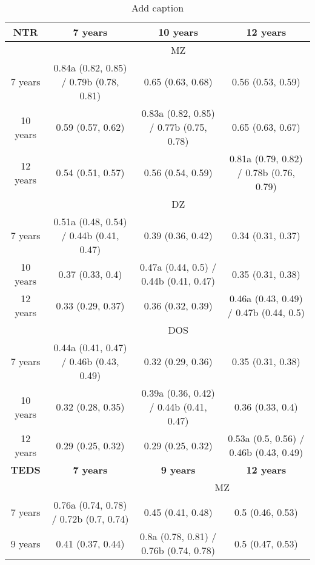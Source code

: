 \begin{table}[htbp]
  \centering
  \caption{Add caption}
    \begin{tabular}{ccccc}
    \toprule
    \textbf{NTR} & \multicolumn{2}{c}{\textbf{7 years}} & \textbf{10 years} & \textbf{12 years} \\
    \midrule
          & \multicolumn{4}{c}{MZ} \\
    7 years & \multicolumn{2}{c}{0.84a (0.82, 0.85) / 0.79b (0.78, 0.81)} & 0.65 (0.63, 0.68) & 0.56 (0.53, 0.59) \\
    10 years & \multicolumn{2}{c}{0.59 (0.57, 0.62)} & 0.83a (0.82, 0.85) / 0.77b (0.75, 0.78) & 0.65 (0.63, 0.67) \\
    12 years & \multicolumn{2}{c}{0.54 (0.51, 0.57)} & 0.56 (0.54, 0.59) & 0.81a (0.79, 0.82) / 0.78b (0.76, 0.79) \\
\cmidrule{1-4}          & \multicolumn{4}{c}{DZ} \\
    7 years & \multicolumn{2}{c}{0.51a (0.48, 0.54) / 0.44b (0.41, 0.47)} & 0.39 (0.36, 0.42) & 0.34 (0.31, 0.37) \\
    10 years & \multicolumn{2}{c}{0.37 (0.33, 0.4)} & 0.47a (0.44, 0.5) / 0.44b (0.41, 0.47) & 0.35 (0.31, 0.38) \\
    12 years & \multicolumn{2}{c}{0.33 (0.29, 0.37)} & 0.36 (0.32, 0.39) & 0.46a (0.43, 0.49) / 0.47b (0.44, 0.5) \\
\cmidrule{1-4}          & \multicolumn{4}{c}{DOS} \\
    7 years & \multicolumn{2}{c}{0.44a (0.41, 0.47) / 0.46b (0.43, 0.49)} & 0.32 (0.29, 0.36) & 0.35 (0.31, 0.38) \\
    10 years & \multicolumn{2}{c}{0.32 (0.28, 0.35)} & 0.39a (0.36, 0.42) / 0.44b (0.41, 0.47) & 0.36 (0.33, 0.4) \\
    12 years & \multicolumn{2}{c}{0.29 (0.25, 0.32)} & 0.29 (0.25, 0.32) & 0.53a (0.5, 0.56) / 0.46b (0.43, 0.49) \\
    \midrule
    \textbf{TEDS} & \multicolumn{2}{c}{\textbf{7 years}} & \textbf{9 years} & \textbf{12 years} \\
    \midrule
          &       & \multicolumn{3}{c}{MZ} \\
    7 years & \multicolumn{2}{c}{0.76a (0.74, 0.78) / 0.72b (0.7, 0.74)} & 0.45 (0.41, 0.48) & 0.5 (0.46, 0.53) \\
    9 years & \multicolumn{2}{c}{0.41 (0.37, 0.44)} & 0.8a (0.78, 0.81) / 0.76b (0.74, 0.78) & 0.5 (0.47, 0.53) \\

\end{tabular}
\end{table}
